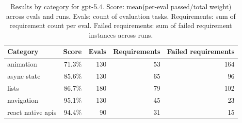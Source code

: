\begin{table}[htbp]
\centering
\begin{tabular}{lrrrr}
\toprule
Category & Score & Evals & Requirements & Failed requirements \\
\midrule
animation & 71.3\% & 130 & 53 & 164 \\
async state & 85.6\% & 130 & 65 & 96 \\
lists & 86.7\% & 180 & 79 & 102 \\
navigation & 95.1\% & 130 & 45 & 23 \\
react native apis & 94.4\% & 90 & 31 & 15 \\
\bottomrule
\end{tabular}
\caption{Results by category for gpt-5.4. Score: mean(per-eval passed/total weight) across evals and runs. Evals: count of evaluation tasks. Requirements: sum of requirement count per eval. Failed requirements: sum of failed requirement instances across runs.}
\end{table}
